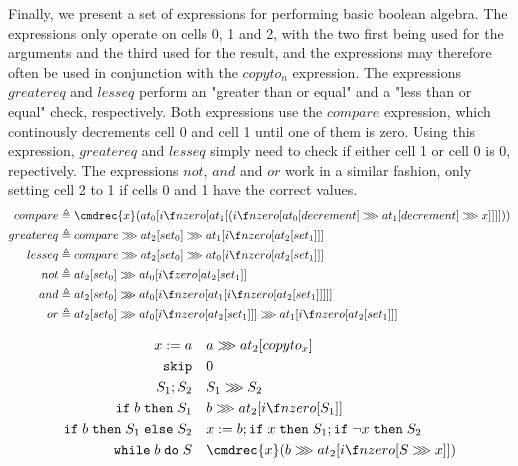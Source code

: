 Finally, we present a set of expressions for performing basic boolean algebra. The expressions only operate on cells 0, 1 and 2, with the two first being used for the arguments and the third used for the result, and the expressions may therefore often be used in conjunction with the $copyto_n$ expression. The expressions $greatereq$ and $lesseq$ perform an "greater than or equal" and a "less than or equal" check, respectively. Both expressions use the $compare$ expression, which continously decrements cell 0 and cell 1 until one of them is zero. Using this expression, $greatereq$ and $lesseq$ simply need to check if either cell 1 or cell 0 is 0, repectively. The expressions $not$, $and$ and $or$ work in a similar fashion, only setting cell 2 to 1 if cells 0 and 1 have the correct values.
\begin{align*}
    compare &\triangleq \cmdrec{x}(at_0[i\f nzero[at_1[(i\f nzero[at_0[decrement] \ggg at_1[decrement] \ggg x]]]]))\\
    greatereq &\triangleq compare \ggg at_2[set_0] \ggg at_1[i\f nzero[at_2[set_1]]]\\
    lesseq &\triangleq compare \ggg at_2[set_0] \ggg at_0[i\f nzero[at_2[set_1]]]\\
    not &\triangleq at_2[set_0] \ggg at_0[i\f zero[at_2[set_1]]\\
    and &\triangleq at_2[set_0] \ggg at_0[i\f nzero[at_1[i\f nzero[at_2[set_1]]]]]\\
    or &\triangleq at_2[set_0] \ggg at_0[i\f nzero[at_2[set_1]]] \ggg at_1[i\f nzero[at_2[set_1]]]\\
\end{align*}

\begin{align*}
    x:=a \quad& a \ggg at_2[copyto_x]\\
    \texttt{skip} \quad& 0\\
    S_1;S_2 \quad& S_1 \ggg S_2\\
    \texttt{if}\; b\; \texttt{then}\; S_1 \quad& b \ggg at_2[i\f nzero[S_1]]\\
    \texttt{if}\; b\; \texttt{then}\; S_1\; \texttt{else}\; S_2 \quad& 
    x:=b;\texttt{if}\; x\; \texttt{then}\; S_1; \texttt{if}\; \neg x\; \texttt{then}\; S_2\\
    \texttt{while}\; b\; \texttt{do}\; S \quad& 
    \cmdrec{x}(b \ggg at_2[i\f nzero[S \ggg x]])\\
\end{align*}


